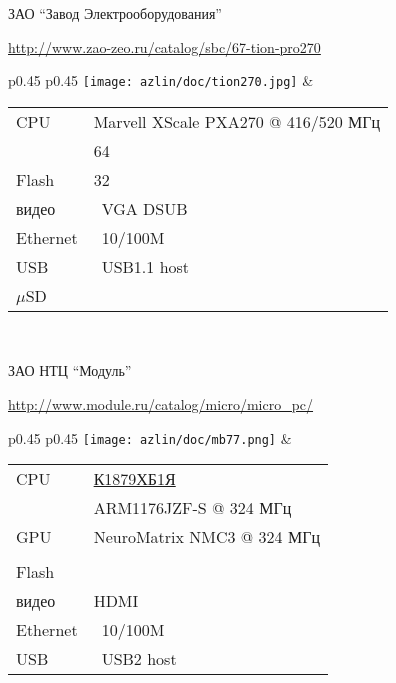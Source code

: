 \secup

\secdown


\label{cubie1}

\label{rpi}

\clearpage
{}\label{tion}

ЗАО ``Завод Электрооборудования''

\url{http://www.zao-zeo.ru/catalog/sbc/67-tion-pro270}

\bigskip
\begin{tabular}{p{} p{}}
\texttt{[image: azlin/doc/tion270.jpg]}
&
\begin{tabular}{l l}
CPU & Marvell XScale PXA270 @ 416/520 МГц \\
\ram & 64 \\
Flash & 32 \\
видео & \checkbox\ VGA DSUB \\
Ethernet & \checkbox\ 10/100M \\
USB & \checkbox\ USB1.1 host \\
$\mu$SD & \checkbox \\
\end{tabular}
\\
\end{tabular}

\clearpage
{}\label{mb77}

ЗАО НТЦ ``Модуль''

\url{http://www.module.ru/catalog/micro/micro_pc/}

\bigskip
\begin{tabular}{p{} p{}}
\texttt{[image: azlin/doc/mb77.png]}
&
\begin{tabular}{l l}
CPU &
\href{http://www.module.ru/catalog/micro/mikroshema\_dekodera\_cifrovogo\_televizionnogo\_signala\_sbis\_k1879hb1ya/}{К1879ХБ1Я}
\\&ARM1176JZF-S @ 324 МГц \\
GPU & NeuroMatrix NMC3 @ 324 МГц \\
\ram & \\
Flash & \\
видео & HDMI \\
Ethernet & \checkbox\ 10/100M \\
USB & \checkbox\ USB2 host \\
\end{tabular}
\\
\end{tabular}


